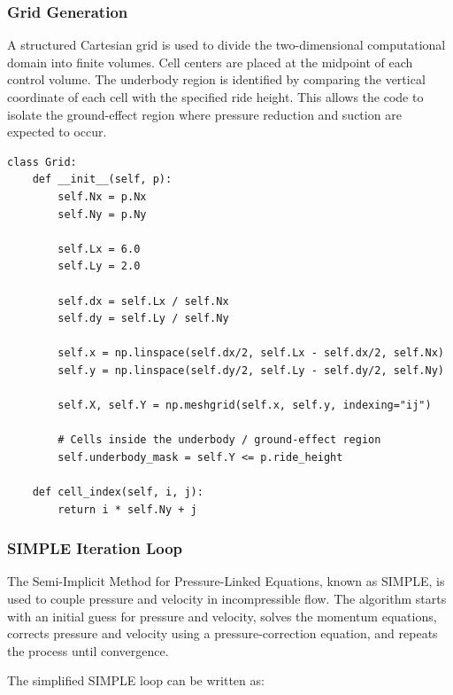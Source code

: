 \documentclass[12pt,a4paper]{article}
\begin{document}
\subsubsection{Grid Generation}

A structured Cartesian grid is used to divide the two-dimensional computational domain
into finite volumes. Cell centers are placed at the midpoint of each control volume. The
underbody region is identified by comparing the vertical coordinate of each cell with the
specified ride height. This allows the code to isolate the ground-effect region where
pressure reduction and suction are expected to occur.

\begin{lstlisting}[style=cleanPython, caption={Simplified grid generation and cell-index mapping.}]
class Grid:
    def __init__(self, p):
        self.Nx = p.Nx
        self.Ny = p.Ny

        self.Lx = 6.0
        self.Ly = 2.0

        self.dx = self.Lx / self.Nx
        self.dy = self.Ly / self.Ny

        self.x = np.linspace(self.dx/2, self.Lx - self.dx/2, self.Nx)
        self.y = np.linspace(self.dy/2, self.Ly - self.dy/2, self.Ny)

        self.X, self.Y = np.meshgrid(self.x, self.y, indexing="ij")

        # Cells inside the underbody / ground-effect region
        self.underbody_mask = self.Y <= p.ride_height

    def cell_index(self, i, j):
        return i * self.Ny + j
\end{lstlisting}

\subsubsection{SIMPLE Iteration Loop}

The Semi-Implicit Method for Pressure-Linked Equations, known as SIMPLE, is used to
couple pressure and velocity in incompressible flow. The algorithm starts with an initial
guess for pressure and velocity, solves the momentum equations, corrects pressure and
velocity using a pressure-correction equation, and repeats the process until convergence.

The simplified SIMPLE loop can be written as:
\end{document}
